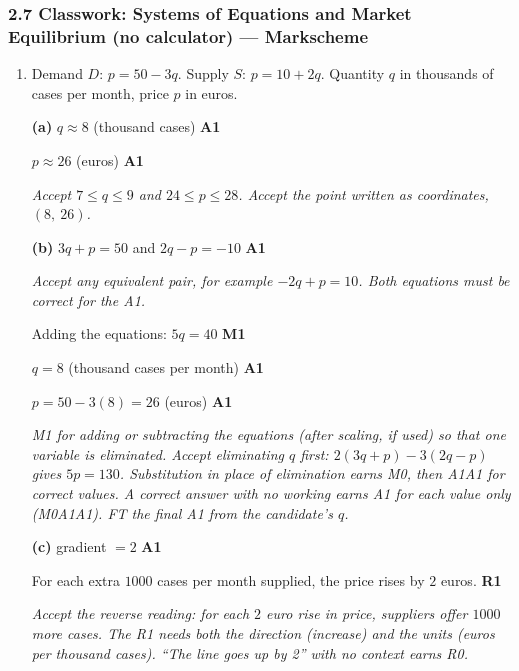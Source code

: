 \documentclass[12pt, twoside]{article}
\begin{document}
\subsubsection*{2.7 Classwork: Systems of Equations and Market Equilibrium (no calculator) --- Markscheme}

\begin{enumerate}[itemsep=0.3cm]

\item[1.] [Maximum mark: 13]

Demand $D$: $p = 50 - 3q$. Supply $S$: $p = 10 + 2q$. Quantity $q$ in
thousands of cases per month, price $p$ in euros.

\textbf{(a)} $q \approx 8$ (thousand cases) \hfill \textbf{A1}

$p \approx 26$ (euros) \hfill \textbf{A1}

\emph{Accept $7 \le q \le 9$ and $24 \le p \le 28$. Accept the point
written as coordinates, $(8,\ 26)$.}

\textbf{(b)} $3q + p = 50$ and $2q - p = -10$ \hfill \textbf{A1}

\emph{Accept any equivalent pair, for example $-2q + p = 10$. Both
equations must be correct for the A1.}

Adding the equations: $5q = 40$ \hfill \textbf{M1}

$q = 8$ (thousand cases per month) \hfill \textbf{A1}

$p = 50 - 3(8) = 26$ (euros) \hfill \textbf{A1}

\emph{M1 for adding or subtracting the equations (after scaling, if used)
so that one variable is eliminated. Accept eliminating $q$ first:
$2(3q + p) - 3(2q - p)$ gives $5p = 130$. Substitution in place of
elimination earns M0, then A1A1 for correct values. A correct answer with
no working earns A1 for each value only (M0A1A1). FT the final A1 from the
candidate's $q$.}

\textbf{(c)} gradient $= 2$ \hfill \textbf{A1}

For each extra $1000$ cases per month supplied, the price rises by
$2$ euros. \hfill \textbf{R1}

\emph{Accept the reverse reading: for each $2$ euro rise in price, suppliers
offer $1000$ more cases. The R1 needs both the direction (increase) and the
units (euros per thousand cases). ``The line goes up by 2'' with no context
earns R0.}


\end{enumerate}
\end{document}
